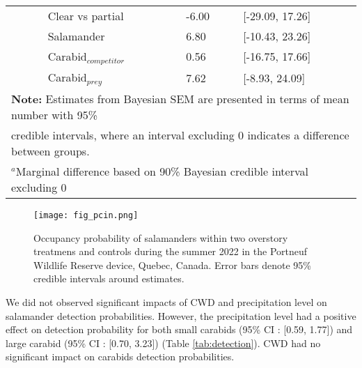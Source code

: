 \begin{table}[ht]
\begin{tabular}{lllll}
                          && Clear vs partial  & -6.00 & [-29.09, 17.26] \\  
                          && Salamander        & \hspace{1mm}6.80 & [-10.43, 23.26] \\ 
                          && Carabid$_{competitor}$      & \hspace{1mm}0.56 & [-16.75, 17.66] \\ 
                          && Carabid$_{prey}$      & \hspace{1mm}7.62 & [-8.93, 24.09] \\ 
      \hline
      \multicolumn{5}{l}{\textbf{Note:} Estimates from Bayesian SEM are presented in terms of mean number with 95\%} \\
      \multicolumn{5}{l}{credible intervals, where an interval excluding 0 indicates a difference between groups.} \\
      \multicolumn{5}{l}{$^{a}$Marginal difference based on 90\% Bayesian credible interval excluding 0}
  \end{tabular}
\end{table}


\clearpage

\begin{figure}[ht]
  \centering
  \texttt{[image: fig\_pcin.png]}
  \caption[Occupancy probability of salamanders under overstory treatments]
  {Occupancy probability of salamanders within two overstory treatmens and controls during the summer 2022 in the Portneuf Wildlife Reserve device, Quebec, Canada. 
  Error bars denote 95\% credible intervals around estimates.}
  \label{fig:pcin}
\end{figure}

\vspace{10pt}

We did not observed significant impacts of CWD and precipitation level on salamander detection probabilities. 
However, the precipitation level had a positive effect on detection probability for both small carabids (95\% CI : [0.59, 1.77]) and large carabid (95\% CI : [0.70, 3.23]) (Table \ref{tab:detection}). 
CWD had no significant impact on carabids detection probabilities.


